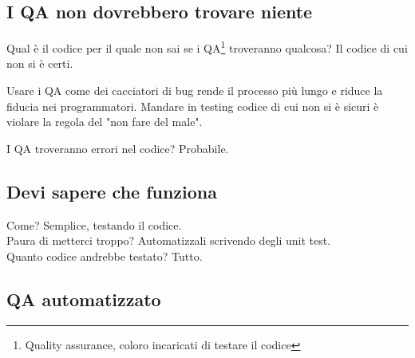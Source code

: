 \documentclass[11pt,a4paper]{book}
\begin{document}
\subsection{I QA non dovrebbero trovare niente}
Qual è il codice per il quale non sai se i QA\footnote{Quality assurance, coloro incaricati di testare il codice} troveranno qualcosa? Il codice di cui non si è certi.

Usare i QA come dei cacciatori di bug rende il processo più lungo e riduce la fiducia nei programmatori. Mandare in testing codice di cui non si è sicuri è violare la regola del "non fare del male".

I QA troveranno errori nel codice? Probabile.

\subsection{Devi sapere che funziona}
Come? Semplice, testando il codice.\\
Paura di metterci troppo? Automatizzali scrivendo degli unit test.\\
Quanto codice andrebbe testato? Tutto.\\

\subsection{QA automatizzato}
\end{document}
